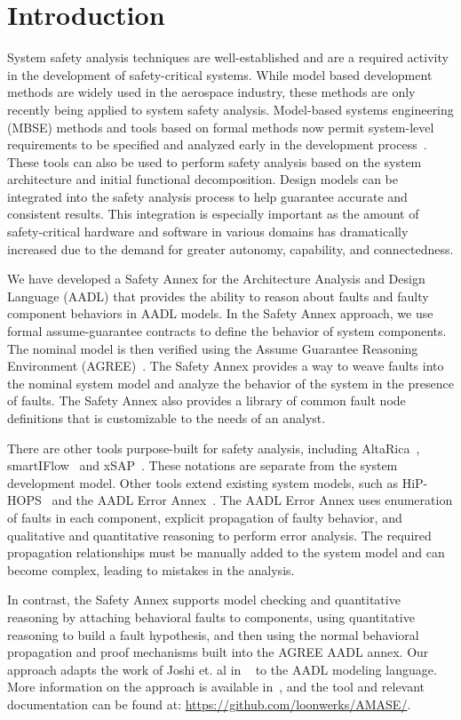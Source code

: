 \section{Introduction}
System safety analysis techniques are well-established and are a required activity in the development of safety-critical systems. While model based development methods are widely used in the aerospace industry, these methods are only recently being applied to system safety analysis. Model-based systems engineering (MBSE) methods and tools based on formal methods now permit system-level requirements to be specified and analyzed early in the development process~\cite{NFM2012:CoGaMiWhLaLu,CAV2015:BoCiGrMa}. These tools can also be used to perform safety analysis based on the system architecture and initial functional decomposition. Design models can be integrated into the safety analysis process to help guarantee accurate and consistent results. This integration is especially important as the amount of safety-critical hardware and software in various domains has dramatically increased due to the demand for greater autonomy, capability, and connectedness.

We have developed a Safety Annex for the Architecture Analysis and Design Language (AADL) that provides the ability to reason about faults and faulty component behaviors in AADL models. In the Safety Annex approach, we use formal assume-guarantee contracts to define the behavior of system components. The nominal model is then verified using the Assume Guarantee Reasoning Environment (AGREE)~\cite{NFM2012:CoGaMiWhLaLu}. The Safety Annex  provides a way to weave faults into the nominal system model and analyze the behavior of the system in the presence of faults. The Safety Annex also provides a library of common fault node definitions that is customizable to the needs of an analyst.

There are other tools purpose-built for safety analysis, including AltaRica~\cite{PROSVIRNOVA2013127}, smartIFlow~\cite{info8010007} and xSAP~\cite{DBLP:conf/tacas/BittnerBCCGGMMZ16}. These notations are separate from the system development model. Other tools extend existing system models, such as HiP-HOPS~\cite{CHEN201391} and the AADL Error Annex~\cite{SAEAS}. The AADL Error Annex uses enumeration of faults in each component, explicit propagation of faulty behavior, and qualitative and quantitative reasoning to perform error analysis. The required propagation relationships must be manually added to the system model and can become complex, leading to mistakes in the analysis.

In contrast, the Safety Annex supports model checking and quantitative reasoning by attaching behavioral faults to components, using quantitative reasoning to build a fault hypothesis, and then using the normal behavioral propagation and proof mechanisms built into the AGREE AADL annex.  Our approach adapts the work of Joshi et. al in
~\cite{Joshi05:Dasc} to the AADL modeling language.  More information on the approach is available in~\cite{Stewart17:IMBSA}, and the tool and relevant documentation can be found at: \small \url{https://github.com/loonwerks/AMASE/}. \normalsize 